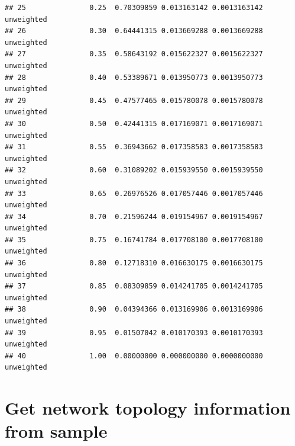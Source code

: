 \documentclass[
]{book}
\begin{document}
\begin{verbatim}
## 25               0.25  0.70309859 0.013163142 0.0013163142 unweighted
## 26               0.30  0.64441315 0.013669288 0.0013669288 unweighted
## 27               0.35  0.58643192 0.015622327 0.0015622327 unweighted
## 28               0.40  0.53389671 0.013950773 0.0013950773 unweighted
## 29               0.45  0.47577465 0.015780078 0.0015780078 unweighted
## 30               0.50  0.42441315 0.017169071 0.0017169071 unweighted
## 31               0.55  0.36943662 0.017358583 0.0017358583 unweighted
## 32               0.60  0.31089202 0.015939550 0.0015939550 unweighted
## 33               0.65  0.26976526 0.017057446 0.0017057446 unweighted
## 34               0.70  0.21596244 0.019154967 0.0019154967 unweighted
## 35               0.75  0.16741784 0.017708100 0.0017708100 unweighted
## 36               0.80  0.12718310 0.016630175 0.0016630175 unweighted
## 37               0.85  0.08309859 0.014241705 0.0014241705 unweighted
## 38               0.90  0.04394366 0.013169906 0.0013169906 unweighted
## 39               0.95  0.01507042 0.010170393 0.0010170393 unweighted
## 40               1.00  0.00000000 0.000000000 0.0000000000 unweighted
\end{verbatim}

\section{Get network topology information from sample}\label{get-network-topology-information-from-sample}
\end{document}
